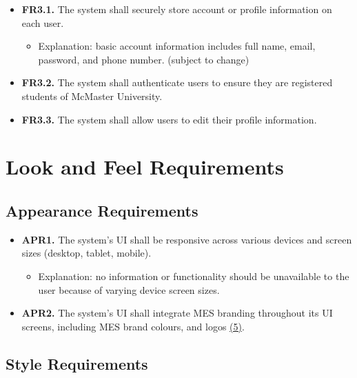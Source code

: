 \documentclass[12pt]{article}
\begin{document}
\begin{itemize}
    \item \hypertarget{FRThreeOne}{ \textbf{FR3.1.} The system shall securely store account or profile information on each user. }
    \begin{itemize}
        \item Explanation: basic account information includes full name, email, password, and phone number. (subject to change)
    \end{itemize}
    \item \hypertarget{FRThreeTwo}{ \textbf{FR3.2.} The system shall authenticate users to ensure they are registered students of McMaster University. }
    \item \hypertarget{FRThreeThree}{ \textbf{FR3.3.} The system shall allow users to edit their profile information. }
\end{itemize}
    

\section{Look and Feel Requirements}

\label{LookAndFeel}

\subsection{Appearance Requirements}

\label{APR}

\begin{itemize}
    \item \hypertarget{APROne}{ \textbf{APR1.} The system's UI shall be responsive across various devices and screen sizes (desktop, tablet, mobile). }
    \begin{itemize}
        \item Explanation: no information or functionality should be unavailable to the user because of varying device screen sizes.
    \end{itemize}
    \item \hypertarget{APROne}{ \textbf{APR2.} The system's UI shall integrate MES branding throughout its UI screens, including MES brand colours, and logos \hyperlink{Ref5}{(5)}. }
\end{itemize}

\subsection{Style Requirements}
\end{document}
